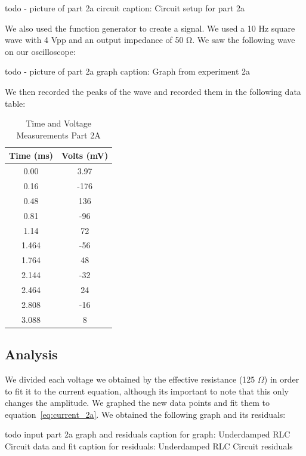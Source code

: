 \documentclass[11pt]{article}
\begin{document}
    todo - picture of part 2a circuit
    caption: Circuit setup for part 2a

    We also used the function generator to create a signal. We used a 10 Hz square wave with 4 Vpp and an output impedance of 50 Ω. We saw the following wave on our oscilloscope:

    todo - picture of part 2a graph
    caption: Graph from experiment 2a

    We then recorded the peaks of the wave and recorded them in the following data table:

    \begin{table}[h]
        \centering
        \caption{Time and Voltage Measurements Part 2A}
        \begin{tabular}{cc}
            \toprule
            \textbf{Time (ms)} & \textbf{Volts (mV)} \\
            \midrule
            0.00 & 3.97 \\
            0.16 & -176 \\
            0.48 & 136 \\
            0.81 & -96 \\
            1.14 & 72 \\
            1.464 & -56 \\
            1.764 & 48 \\
            2.144 & -32 \\
            2.464 & 24 \\
            2.808 & -16 \\
            3.088 & 8 \\
            \bottomrule
        \end{tabular}
    \end{table}



    \subsection{Analysis}\label{subsec:part2a_analysis}
    We divided each voltage we obtained by the effective resistance (125 $\Omega$) in order to fit it to the current equation, although its important to note that this only changes the amplitude. We graphed the new data points and fit them to equation~\ref{eq:current_2a}. We obtained the following graph and its residuals:

    todo input part 2a graph and residuals
    caption for graph: Underdamped RLC Circuit data and fit
    caption for residuals: Underdamped RLC Circuit residuals
\end{document}
